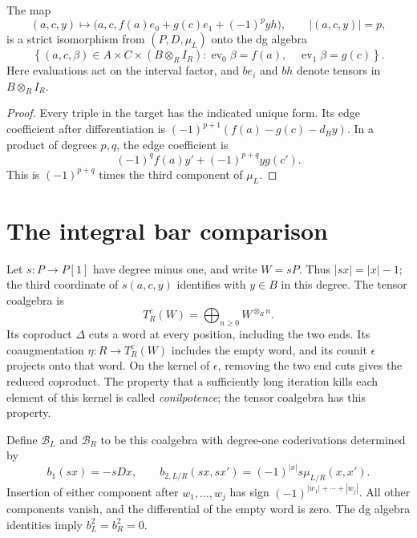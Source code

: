 \begin{proposition}\label{v4-arith:gluing:prop:interval}
The map
\[
 (a,c,y)\longmapsto
 \bigl(a,c,f(a)e_0+g(c)e_1+(-1)^p yh\bigr),\qquad |(a,c,y)|=p,
\]
is a strict isomorphism from \((P,D,\mu_L)\) onto the dg algebra
\[
 \left\{(a,c,\beta)\in A\times C\times(B\otimes_R I_R):
       \operatorname{ev}_0\beta=f(a),\quad
       \operatorname{ev}_1\beta=g(c)\right\}.
\]
Here evaluations act on the interval factor, and \(be_i\) and \(bh\)
denote tensors in \(B\otimes_R I_R\).
\end{proposition}

\begin{proof}
Every triple in the target has the indicated unique form. Its edge
coefficient after differentiation is
\((-1)^{p+1}(f(a)-g(c)-d_By)\).
In a product of degrees \(p,q\), the edge coefficient is
\[
 (-1)^qf(a)y'+(-1)^{p+q}yg(c').
\]
This is \((-1)^{p+q}\) times the third component of \(\mu_L\).
\end{proof}

\section{The integral bar comparison}
\label{v4-arith:gluing:sec:bar}

Let \(s:P\to P[1]\) have degree minus one, and write \(W=sP\).
Thus \(|sx|=|x|-1\); the third coordinate of
\(s(a,c,y)\) identifies with \(y\in B\) in this degree. The tensor
coalgebra is
\[
 T_R^c(W)=\bigoplus_{n\geq0}W^{\otimes_R n}.
\]
Its coproduct \(\Delta\) cuts a word at every position, including the
two ends. Its coaugmentation \(\eta:R\to T_R^c(W)\) includes the empty
word, and its counit \(\epsilon\) projects onto that word. On the
kernel of \(\epsilon\), removing the two end cuts gives the reduced
coproduct. The property that a sufficiently long iteration kills each
element of this kernel is called
\emph{conilpotence}; the tensor coalgebra has this property.

Define \(\mathcal B_L\) and \(\mathcal B_R\) to be this coalgebra with
degree-one coderivations determined by
\begin{equation}\label{v4-arith:gluing:eq:bar-signs}
 b_1(sx)=-sDx,\qquad
 b_{2,L/R}(sx,sx')=(-1)^{|x|}s\mu_{L/R}(x,x').
\end{equation}
Insertion of either component after \(w_1,\ldots,w_j\) has sign
\((-1)^{|w_1|+\cdots+|w_j|}\). All other components vanish, and the
differential of the empty word is zero. The dg algebra identities imply
\(b_L^2=b_R^2=0\).

